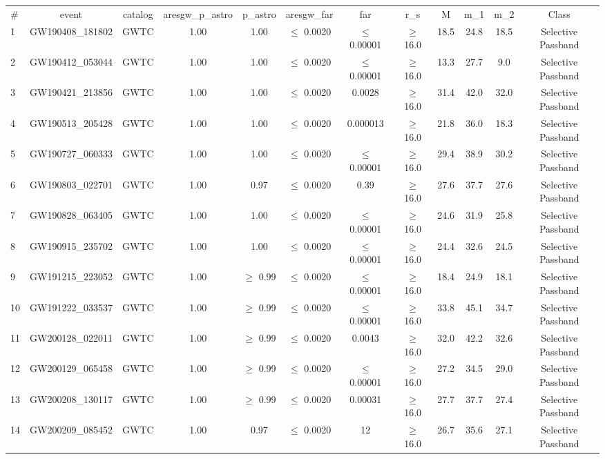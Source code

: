\begin{tabular}{!{\vrule width 1pt}l|c|c|c|c|c|c|c|c|c|c|c!{\vrule width 1pt}}
# & event & catalog & aresgw_p_astro & p_astro & aresgw_far & far  & r_s & M & m_1 & m_2 & Class \\
1 & GW190408\_181802 & GWTC & 1.00 & 1.00 & $\leq$ 0.0020 & $\leq$ 0.00001 & $\geq$ 16.0 & 18.5 & 24.8 & 18.5 & Selective Passband  \\
2 & GW190412\_053044 & GWTC & 1.00 & 1.00 & $\leq$ 0.0020 & $\leq$ 0.00001 & $\geq$ 16.0 & 13.3 & 27.7 & 9.0 & Selective Passband \\
3 & GW190421\_213856 & GWTC & 1.00 & 1.00 & $\leq$ 0.0020 & 0.0028 & $\geq$ 16.0 & 31.4 & 42.0 & 32.0 & Selective Passband  \\
4 & GW190513\_205428 & GWTC & 1.00 & 1.00 & $\leq$ 0.0020 & 0.000013 & $\geq$ 16.0 & 21.8 & 36.0 & 18.3 & Selective Passband  \\
5 & GW190727\_060333 & GWTC & 1.00 & 1.00 & $\leq$ 0.0020 & $\leq$ 0.00001 & $\geq$ 16.0 & 29.4 & 38.9 & 30.2 & Selective Passband  \\
6 & GW190803\_022701 & GWTC & 1.00 & 0.97 & $\leq$ 0.0020 & 0.39 & $\geq$ 16.0 & 27.6 & 37.7 & 27.6 & Selective Passband \\
7 & GW190828\_063405 & GWTC & 1.00 & 1.00 & $\leq$ 0.0020 & $\leq$ 0.00001 & $\geq$ 16.0 & 24.6 & 31.9 & 25.8 & Selective Passband  \\
8 & GW190915\_235702 & GWTC & 1.00 & 1.00 & $\leq$ 0.0020 & $\leq$ 0.00001 & $\geq$ 16.0 & 24.4 & 32.6 & 24.5 & Selective Passband  \\
9 & GW191215\_223052 & GWTC & 1.00 & $\geq$ 0.99 & $\leq$ 0.0020 & $\leq$ 0.00001 & $\geq$ 16.0 & 18.4 & 24.9 & 18.1 & Selective Passband  \\
10 & GW191222\_033537 & GWTC & 1.00 & $\geq$ 0.99 & $\leq$ 0.0020 & $\leq$ 0.00001 & $\geq$ 16.0 & 33.8 & 45.1 & 34.7 & Selective Passband \\
11 & GW200128\_022011 & GWTC & 1.00 &  $\geq$ 0.99 & $\leq$ 0.0020 & 0.0043 & $\geq$ 16.0 & 32.0 & 42.2 & 32.6 & Selective Passband \\
12 & GW200129\_065458 & GWTC & 1.00 &  $\geq$ 0.99 & $\leq$ 0.0020 & $\leq$ 0.00001 & $\geq$ 16.0 & 27.2 & 34.5 & 29.0 & Selective Passband \\
13 & GW200208\_130117 & GWTC & 1.00 &  $\geq$ 0.99 & $\leq$ 0.0020 & 0.00031 & $\geq$ 16.0 & 27.7 & 37.7 & 27.4 & Selective Passband \\
14 & GW200209\_085452 & GWTC & 1.00 & 0.97 & $\leq$ 0.0020 & 12 & $\geq$ 16.0 & 26.7 & 35.6 & 27.1 & Selective Passband \\

\end{tabular}
